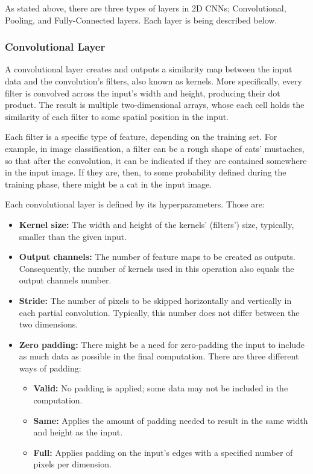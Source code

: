 As stated above, there are three types of layers in 2D CNNs; Convolutional, Pooling, and Fully-Connected layers. Each layer is being described below.

\subsubsection{Convolutional Layer}
A convolutional layer creates and outputs a similarity map between the input data and the convolution's filters, also known as kernels. More specifically, every filter is convolved across the input's width and height, producing their dot product. The result is multiple two-dimensional arrays, whose each cell holds the similarity of each filter to some spatial position in the input.

Each filter is a specific type of feature, depending on the training set. For example, in image classification, a filter can be a rough shape of cats' mustaches, so that after the convolution, it can be indicated if they are contained somewhere in the input image. If they are, then, to some probability defined during the training phase, there might be a cat in the input image.

Each convolutional layer is defined by its hyperparameters. Those are:
\begin{itemize}
	\item \textbf{Kernel size:} The width and height of the kernels' (filters') size, typically, small\-er than the given input.
	\item \textbf{Output channels:} The number of feature maps to be created as outputs. Consequently, the number of kernels used in this operation also equals the output channels number.
	\item \textbf{Stride:} The number of pixels to be skipped horizontally and vertically in each partial convolution. Typically, this number does not differ between the two dimensions.
	\item \textbf{Zero padding:} There might be a need for zero-padding the input to include as much data as possible in the final computation. There are three different ways of padding:
	      \begin{itemize}
		      \item \textbf{Valid:} No padding is applied; some data may not be included in the computation.
		      \item \textbf{Same:} Applies the amount of padding needed to result in the same width and height as the input.
		      \item \textbf{Full:} Applies padding on the input's edges with a specified number of pixels per dimension.
	      \end{itemize}
\end{itemize}

